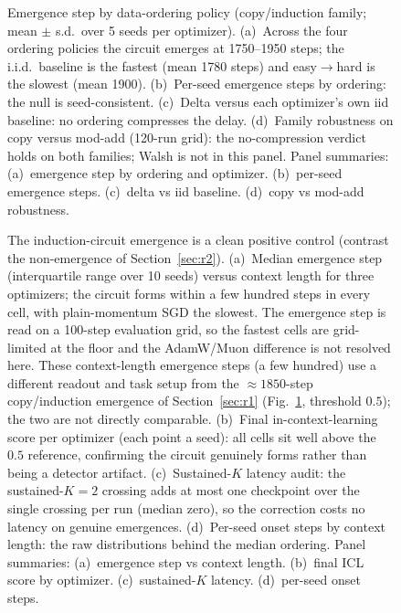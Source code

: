 \documentclass[11pt]{article}
\theoremstyle{plain}
\theoremstyle{definition}
\begin{document}
\begin{figure}[t]
\centering
{}
\caption{Emergence step by data-ordering policy (copy/induction family; mean $\pm$ s.d.\
over 5 seeds per optimizer). (a)~Across the four ordering policies the circuit emerges at
1750--1950 steps; the i.i.d.\ baseline is the fastest (mean 1780 steps) and easy$\to$hard
is the slowest (mean 1900).
(b)~Per-seed emergence steps by ordering: the null is seed-consistent.
(c)~Delta versus each optimizer's own iid baseline: no ordering compresses
the delay.
(d)~Family robustness on copy versus mod-add (120-run grid): the
no-compression verdict holds on both families; Walsh is not in this panel.
Panel summaries: (a)~emergence step by ordering and optimizer. (b)~per-seed emergence steps. (c)~delta vs iid baseline. (d)~copy vs mod-add robustness.}
\label{fig:curriculum}
\end{figure}

\begin{figure}[htbp]
\centering
{}
\caption{The induction-circuit emergence is a clean positive control (contrast the
non-emergence of Section~\ref{sec:r2}). (a)~Median emergence step (interquartile range over 10 seeds) versus context
length for three optimizers; the circuit forms within a few hundred steps in every cell, with
plain-momentum SGD the slowest. The emergence step is read on a 100-step evaluation grid, so
the fastest cells are grid-limited at the floor and the AdamW/Muon difference is not resolved
here. These context-length emergence steps (a few hundred) use a different readout and task
setup from the ${\approx}1850$-step copy/induction emergence of Section~\ref{sec:r1}
(Fig.~\ref{fig:curriculum}, threshold $0.5$); the two are not directly comparable.
(b)~Final in-context-learning score per optimizer (each point a seed): all cells sit
well above the $0.5$ reference, confirming the circuit genuinely forms rather than being a
detector artifact.
(c)~Sustained-$K$ latency audit: the sustained-$K{=}2$ crossing adds at most
one checkpoint over the single crossing per run (median zero), so the
correction costs no latency on genuine emergences.
(d)~Per-seed onset steps by context length: the raw distributions behind the
median ordering.
Panel summaries: (a)~emergence step vs context length. (b)~final ICL score by optimizer. (c)~sustained-$K$ latency. (d)~per-seed onset steps.}
\label{fig:induction-emergence}
\end{figure}
\end{document}
